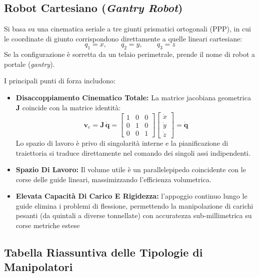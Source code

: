﻿\documentclass[11pt, a4paper]{article}
\begin{document}
\newpage

\subsection{Robot Cartesiano (\textit{Gantry Robot})}
Si basa su una cinematica seriale a tre giunti prismatici ortogonali ($\text{PPP}$), in cui le coordinate di giunto corrispondono direttamente a quelle lineari cartesiane:
\[
    q_1 = x, \qquad q_2 = y, \qquad q_3 = z
\]
Se la configurazione è sorretta da un telaio perimetrale, prende il nome di robot a portale (\textit{gantry}).

I principali punti di forza includono:
\begin{itemize}
    \item \textbf{Disaccoppiamento Cinematico Totale:} La matrice jacobiana geometrica $\boldsymbol{J}$ coincide con la matrice identità:
    \[
        \boldsymbol{v}_e = \boldsymbol{J} \, \dot{\boldsymbol{q}} = \begin{bmatrix} 1 & 0 & 0 \\ 0 & 1 & 0 \\ 0 & 0 & 1 \end{bmatrix} \begin{bmatrix} \dot{x} \\ \dot{y} \\ \dot{z} \end{bmatrix} = \dot{\boldsymbol{q}}
    \]
    Lo spazio di lavoro è privo di singolarità interne e la pianificazione di traiettoria si traduce direttamente nel comando dei singoli assi indipendenti.
    \item \textbf{Spazio Di Lavoro:} Il volume utile è un parallelepipedo coincidente con le corse delle guide lineari, massimizzando l'efficienza volumetrica.
    \item \textbf{Elevata Capacità Di Carico E Rigidezza:} l'appoggio continuo lungo le guide elimina i problemi di flessione, permettendo la manipolazione di carichi pesanti (da quintali a diverse tonnellate) con accuratezza sub-millimetrica su corse metriche estese
\end{itemize}

\subsection{Tabella Riassuntiva delle Tipologie di Manipolatori}
\end{document}
